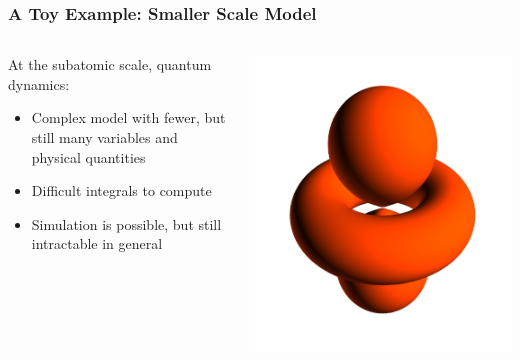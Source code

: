 \documentclass[aspectratio=169, 12pt]{beamer}
\begin{document}
\begin{frame}

    \frametitle{A Toy Example: Smaller Scale Model}

    \begin{columns}
        
    \begin{column}{.6\textwidth}
        At the subatomic scale, quantum dynamics:

        \begin{itemize}
            \item Complex model with fewer, but still many variables and physical quantities
            \item Difficult integrals to compute
            \item Simulation is possible, but still intractable in general
        \end{itemize}
    \end{column}
    \begin{column}{.4\textwidth}
        \includegraphics[width=\textwidth]{images/hydrogen-atom.jpg}
    \end{column}
    \end{columns}

\end{frame}
\end{document}
